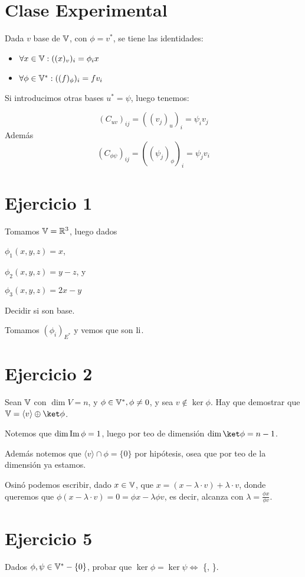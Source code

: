 \documentclass{article}
\begin{document}
\section*{Clase Experimental}
Dada $v$ base de $\mathbb{V}$, con $\phi = v^*$, se tiene las identidades:
\begin{itemize}
	\item $\forall x \in \mathbb{V} : ((x)_v)_i = \phi_ix$
	\item $\forall \phi \in \mathbb{V}^* : ((f)_\phi)_i = f v_i$
\end{itemize}

Si introducimos otras bases $u^* = \psi$, luego tenemos:

\[
(C_{uv})_{ij} = ((v_j)_u)_i = \psi_i v_j
\]
Además
\[
(C_{\phi \psi})_{ij} = ((\psi_j)_\phi)_i = \psi_j v_i
\]

\section*{Ejercicio 1}
Tomamos $\mathbb{V} = \mathbb{R}^3$, luego dados

$\phi_1 (x,y,z) = x$,

$\phi_2 (x, y, z) = y-z$, y

$\phi_3 (x,y,z) = 2x-y$

Decidir si son base.

Tomamos $(\phi_i)_{E^*}$ y vemos que son $\operatorname{li}$.

\section*{Ejercicio 2}
Sean $\mathbb{V}$ con $\dim V = n$, y $\phi \in \mathbb{V}^*, \phi \neq 0$, y sea $v \notin
\ker \phi$. Hay que demostrar que $\V = \langle v \rangle \oplus \ket \phi$.

Notemos que $\dim \operatorname{Im} \phi = 1$, luego por teo de dimensión $\dim \ket \phi =
n-1$.

Además notemos que $\langle v \rangle \cap \phi = \{0\}$ por hipótesis, osea
que por teo de la dimensión ya estamos.

Osinó podemos escribir, dado $x \in \mathbb{V}$, que $x = (x - \lambda \cdot v) +
\lambda \cdot v$, donde queremos que $\phi (x - \lambda \cdot v) = 0 = \phi x
-\lambda \phi v$, es decir, alcanza con $\lambda = \frac{\phi x}{\phi v}$.

\section*{Ejercicio 5}
Dados $\phi, \psi \in \mathbb{V}^* - \{0\}$, probar que $\ker \phi = \ker \psi \iff$
\{\phi, \psi\}.
\end{document}
